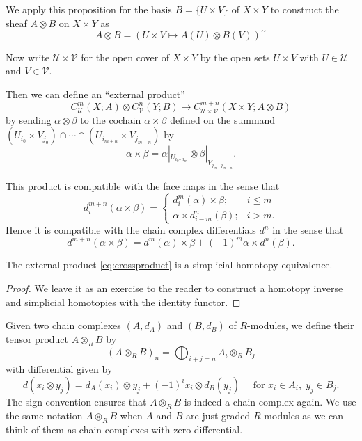 \documentclass[a4paper,openany]{scrbook}
\begin{document}
We apply this proposition for the basis $B=\{U \times V\}$ of $X \times Y$ to construct the sheaf $A \otimes B$ on $X \times Y$ as
\[
A \otimes B = (U \times V \mapsto A(U) \otimes B(V))^{\sim}
\]

Now write $\mathcal U \times \mathcal V$ for the open cover of $X \times Y$ by the open sets $U \times V$ with $U \in \mathcal U$ and $V \in \mathcal V$.

Then we can define an “external product”
\begin{equation}\label{eq:crossproduct}
C^m_{\mathcal U}(X;A) \otimes C^n_{\mathcal V}(Y;B) \to C^{m+n}_{\mathcal U \times \mathcal V}(X\times Y;A \otimes B)
\end{equation}
by sending $\alpha \otimes \beta$ to the cochain $\alpha \times \beta$ defined on the summand $(U_{i_0} \times V_{j_0}) \cap \cdots \cap (U_{i_{m+n}} \times V_{j_{m+n}})$ by
\[
\alpha \times \beta = \alpha|_{U_{i_0\cdots i_m}} \otimes \beta|_{V_{j_m\cdots j_{m+n}}}.
\]

This product is compatible with the face maps in the sense that
\[
d^{m+n}_i(\alpha \times \beta) = \begin{cases}
d^m_i(\alpha) \times \beta; & i \leq m\\
\alpha \times d^n_{i-m}(\beta); & i > m.
\end{cases}
\]
Hence it is compatible with the chain complex differentials $d^n$ in the sense that
\[
d^{m+n}(\alpha \times \beta) = d^m(\alpha) \times \beta + (-1)^m \alpha \times d^n(\beta).
\]

\begin{thm}\label{thm:Eilenberg-Zilber}
The external product \eqref{eq:crossproduct} is a simplicial homotopy equivalence.
\end{thm}
\begin{proof}
We leave it as an exercise to the reader to construct a homotopy inverse and simplicial homotopies with the identity functor.
\end{proof}

Given two chain complexes $(A,d_A)$ and $(B,d_B)$ of $R$-modules, we define their tensor product $A \otimes_R B$ by
\[
(A \otimes_R B)_n = \bigoplus_{i+j=n} A_i \otimes_R B_j
\]
with differential given by
\[
d(x_i \otimes y_j) = d_A(x_i) \otimes y_j + (-1)^i x_i \otimes d_B(y_j) \quad \text{ for } x_i \in A_i,\; y_j \in B_j.
\]
The sign convention ensures that $A \otimes_R B$ is indeed a chain complex again. We use the same notation $A \otimes_R B$ when $A$ and $B$ are just graded $R$-modules as we can think of them as chain complexes with zero differential.
\end{document}
